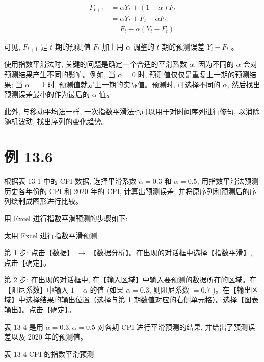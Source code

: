 \documentclass[10pt]{article}
\begin{document}
\begin{CJK*}{UTF8}{bsmi}
\begin{align*}
F_{t+1} & =\alpha Y_{t}+(1-\alpha) F_{t} \\
& =\alpha Y_{t}+F_{t}-\alpha F_{t} \\
& =F_{t}+\alpha\left(Y_{t}-F_{t}\right) \tag{13.18}
\end{align*}


可见, $F_{t+1}$ 是 $t$ 期的预测值 $F_{t}$ 加上用 $\alpha$ 调整的 $t$ 期的预测误差 $Y_{t}-F_{t}$ 。

使用指数平滑法时, 关键的问题是确定一个合适的平滑系数 $\alpha$, 因为不同的 $\alpha$ 会对预测结果产生不同的影响。例如, 当 $\alpha=0$ 时, 预测值仅仅是重复上一期的预测结果; 当 $\alpha=$ 1 时, 预测值就是上一期的实际值。预测时, 可选择不同的 $\alpha$, 然后找出预测误差最小的作为最后的 $\alpha$ 值。

此外, 与移动平均法一样, 一次指数平滑法也可以用于对时间序列进行修匀, 以消除随机波动, 找出序列的变化趋势。

\section*{例 13.6}
根据表 13-1 中的 CPI 数据, 选择平滑系数 $\alpha=0.3$ 和 $\alpha=0.5$, 用指数平滑法预测历史各年份的 CPI 和 2020 年的 CPI, 计算出预测误差, 并将原序列和预测后的序列绘制成图形进行比较。

用 Excel 进行指数平滑预测的步骤如下:

太用 Excel 进行指数平滑预测

第 1 步: 点击【数据】 $\rightarrow$ 【数据分析】。在出现的对话框中选择【指数平滑】, 点击【确定】。

第 2 步: 在出现的对话框中, 在【输入区域】中输入要预测的数据所在的区域。在【阻尼系数】中输入 $1-\alpha$ 的值 (如果 $\alpha=0.3$, 则阻尼系数 $=0.7$ )。在【输出区域】中选择结果的输出位置（选择与第 1 期数值对应的右侧单元格）。选择【图表输出】。点击【确定】。

表 13-4 是用 $\alpha=0.3, \alpha=0.5$ 对各期 CPI 进行平滑预测的结果, 并给出了预测误差以及 2020 年的预测值。

表 13-4 CPI 的指数平滑预测


\end{CJK*}
\end{document}
